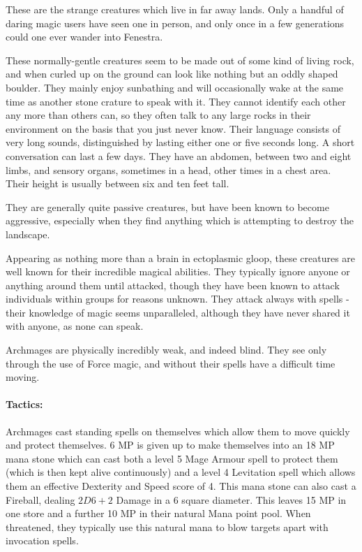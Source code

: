 \begin{multicols}{2}

These are the strange creatures which live in far away lands.  Only a handful of daring magic users have seen one in person, and only once in a few generations could one ever wander into Fenestra.

\label{rockman}

\rockman

These normally-gentle creatures seem to be made out of some kind of living rock, and when curled up on the ground can look like nothing but an oddly shaped boulder.  They mainly enjoy sunbathing and will occasionally wake at the same time as another stone crature to speak with it.  They cannot identify each other any more than others can, so they often talk to any large rocks in their environment on the basis that you just never know.  Their language consists of very long sounds, distinguished by lasting either one or five seconds long.  A short conversation can last a few days.  They have an abdomen, between two and eight limbs, and sensory organs, sometimes in a head, other times in a chest area.  Their height is usually between six and ten feet tall.

They are generally quite passive creatures, but have been known to become aggressive, especially when they find anything which is attempting to destroy the landscape.

\label{archmage}

\archmage

Appearing as nothing more than a brain in ectoplasmic gloop, these creatures are well known for their incredible magical abilities.  They typically ignore anyone or anything around them until attacked, though they have been known to attack individuals within groups for reasons unknown.  They attack always with spells - their knowledge of magic seems unparalleled, although they have never shared it with anyone, as none can speak.

Archmages are physically incredibly weak, and indeed blind.  They see only through the use of Force magic, and without their spells have a difficult time moving.

\paragraph{Tactics:} Archmages cast standing spells on themselves which allow them to move quickly and protect themselves.  6 MP is given up to make themselves into an 18 MP mana stone which can cast both a level 5 Mage Armour spell to protect them (which is then kept alive continuously) and a level 4 Levitation spell which allows them an effective Dexterity and Speed score of 4.  This mana stone can also cast a Fireball, dealing $2D6+2$ Damage in a 6 square diameter.  This leaves 15 MP in one store and a further 10 MP in their natural Mana point pool.  When threatened, they typically use this natural mana to blow targets apart with invocation spells.


\end{multicols}
